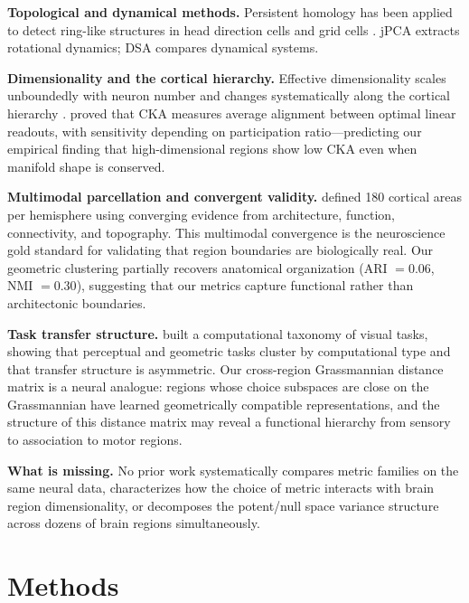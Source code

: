 \documentclass{article}
\begin{document}
\textbf{Topological and dynamical methods.} Persistent homology has been applied to detect ring-like structures in head direction cells \citep{gardner2022toroidal} and grid cells \citep{rybakken2019decoding}. jPCA \citep{churchland2012neural} extracts rotational dynamics; DSA \citep{ostrow2023beyond} compares dynamical systems.

\textbf{Dimensionality and the cortical hierarchy.} Effective dimensionality scales unboundedly with neuron number \citep{stringer2024unbounded} and changes systematically along the cortical hierarchy \citep{huntenburg2024categorical}. \citet{harvey2024representational} proved that CKA measures average alignment between optimal linear readouts, with sensitivity depending on participation ratio---predicting our empirical finding that high-dimensional regions show low CKA even when manifold shape is conserved.

\textbf{Multimodal parcellation and convergent validity.} \citet{glasser2016multi} defined 180 cortical areas per hemisphere using converging evidence from architecture, function, connectivity, and topography. This multimodal convergence is the neuroscience gold standard for validating that region boundaries are biologically real. Our geometric clustering partially recovers anatomical organization (ARI $= 0.06$, NMI $= 0.30$), suggesting that our metrics capture functional rather than architectonic boundaries.

\textbf{Task transfer structure.} \citet{zamir2018taskonomy} built a computational taxonomy of visual tasks, showing that perceptual and geometric tasks cluster by computational type and that transfer structure is asymmetric. Our cross-region Grassmannian distance matrix is a neural analogue: regions whose choice subspaces are close on the Grassmannian have learned geometrically compatible representations, and the structure of this distance matrix may reveal a functional hierarchy from sensory to association to motor regions.

\textbf{What is missing.} No prior work systematically compares metric families on the same neural data, characterizes how the choice of metric interacts with brain region dimensionality, or decomposes the potent/null space variance structure across dozens of brain regions simultaneously.

\section{Methods}
\end{document}
